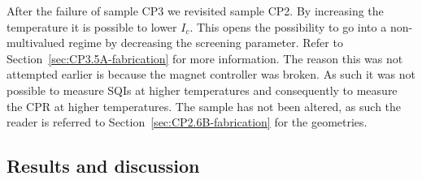After the failure of sample CP3 we revisited sample CP2. By increasing the temperature it is possible to lower $I_c$. This opens the possibility to go into a non-multivalued regime by decreasing the screening parameter. Refer to Section~\ref{sec:CP3.5A-fabrication} for more information. The reason this was not attempted earlier is because the magnet controller was broken. As such it was not possible to measure SQIs at higher temperatures and consequently to measure the CPR at higher temperatures. The sample has not been altered, as such the reader is referred to Section~\ref{sec:CP2.6B-fabrication} for the geometries.

\subsection{Results and discussion}
